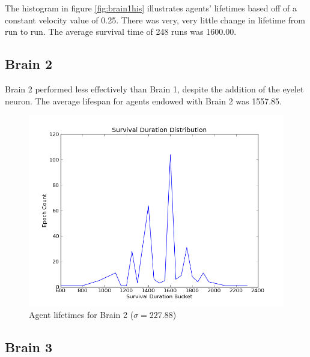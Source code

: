 The histogram in figure \ref{fig:brain1his} illustrates agents' lifetimes based
off of a constant velocity value of 0.25. There was very, very little change
in lifetime from run to run. The average survival time of 248 runs was 
1600.00.

\subsection{Brain 2}
Brain 2 performed less effectively than Brain 1, despite the addition of the
eyelet neuron. The average lifespan for agents endowed with Brain 2 was 
1557.85.

\begin{figure}
\begin{center}
  \includegraphics[scale=.65]{plots/brain2hist.png}
  \caption{Agent lifetimes for Brain 2 ($\sigma = 227.88$)}
  \label{fig:brain2his}
\end{center}
\end{figure}

\subsection{Brain 3}

